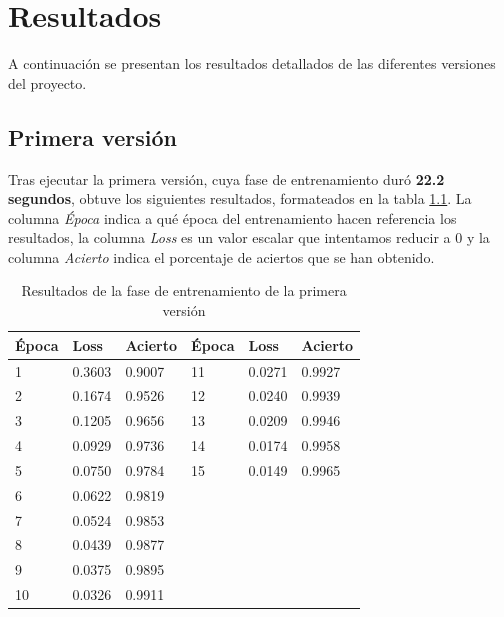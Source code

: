\chapter{Resultados}
\label{chap:res}

A continuación se presentan los resultados detallados de las diferentes versiones del proyecto.

\bigskip

\section{Primera versión}

Tras ejecutar la primera versión, cuya fase de entrenamiento duró \textbf{22.2 segundos}, obtuve los siguientes resultados, formateados en la tabla \ref{tab:v1}. La columna \textit{Época} indica a qué época del entrenamiento hacen referencia los resultados, la columna \textit{Loss} es un valor escalar que intentamos reducir a 0 y la columna \textit{Acierto} indica el porcentaje de aciertos que se han obtenido.

\bigskip

\begin{table}[H]
  \centering
  \begin{tabular}{|l|l|l||l|l|l|}
    \hline
    \textbf{Época} & \textbf{Loss} & \textbf{Acierto} & \textbf{Época} & \textbf{Loss} & \textbf{Acierto} \\
    \hline
    1     & 0.3603 & 0.9007  & 11    & 0.0271 & 0.9927  \\
    2     & 0.1674 & 0.9526  & 12    & 0.0240 & 0.9939  \\
    3     & 0.1205 & 0.9656  & 13    & 0.0209 & 0.9946  \\
    4     & 0.0929 & 0.9736  & 14    & 0.0174 & 0.9958  \\
    5     & 0.0750 & 0.9784  & 15    & 0.0149 & 0.9965  \\
    6     & 0.0622 & 0.9819  &       &        &         \\
    7     & 0.0524 & 0.9853  &       &        &         \\
    8     & 0.0439 & 0.9877  &       &        &         \\
    9     & 0.0375 & 0.9895  &       &        &         \\
    10    & 0.0326 & 0.9911  &       &        &         \\
    \hline
  \end{tabular}
  \label{tab:v1}
  \caption{Resultados de la fase de entrenamiento de la primera versión}
\end{table}


